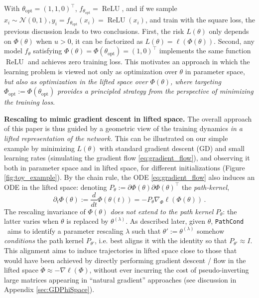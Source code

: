 \documentclass{article}
\theoremstyle{plain}
\theoremstyle{definition}
\theoremstyle{remark}
\def\Ncal{\mathcal{N}}
\def\relu{\operatorname{ReLU}}
\def\pathcond{{\texttt{PathCond} }}
\begin{document}
 With $\theta_{\operatorname{opt}} = (1, 1, 0)^\top$, $f_{\theta_{\operatorname{opt}}} = \relu$, and if 
we sample $x_i \sim \Ncal(0,1), y_i = f_{\theta_{\operatorname{opt}} }(x_{i}) = \relu(x_i)$, 
and train with the square loss, the previous discussion leads to two conclusions. First, the risk $L(\theta)$ only depends on $\Phi(\theta)$ 
when $u> 0$, it can be factorized as $L(\theta)=\ell(\Phi(\theta))$.
Second, any model $f_\theta$ satisfying 
$\Phi(\theta) = \Phi(\theta_{\operatorname{opt}}) = (1, 0)^\top$ implements the same 
function $\relu$ and achieves zero training loss. 
This motivates an approach in which the learning problem is viewed not only as optimization over $\theta$ in parameter space, 
\emph{but also as optimization in the lifted space over $\Phi(\theta)$, 
where targeting $\Phi_{\operatorname{opt}} := \Phi(\theta_{\operatorname{opt}})$ 
provides a principled strategy from the perspective of minimizing the training loss}.





\textbf{Rescaling to mimic gradient descent in lifted space.} The overall approach of this paper is thus guided by a geometric view of the training dynamics {\em in a lifted representation of the network.}
This can be illustrated on our simple example by minimizing $L(\theta)$ with standard gradient descent (GD) and small learning rates 
(simulating the gradient flow \eqref{eq:gradient_flow}), and observing 
it both in parameter space and in lifted space, for different initializations (Figure \ref{fig:toy_example}). By the chain rule, the ODE \eqref{eq:gradient_flow} also
induces an ODE in the lifted space: denoting $P_\theta := \partial \Phi(\theta)  \partial \Phi(\theta)^\top$ the {\em path-kernel},
\begin{equation}
\partial_t
 \Phi(\theta) 
:= \frac{d}{dt} \Phi(\theta(t))
= - P_\theta \nabla_\Phi \ell(\Phi(\theta))\,. 
\end{equation}
The rescaling invariance of $\Phi(\theta)$ {\em does not extend to the path kernel} $P_{\theta}$: the latter varies when $\theta$ is replaced by $\theta^{(\lambda)}$.  As described later, given $\theta$, \pathcond\ aims to identify a parameter rescaling $\lambda$ such that $\theta' := \theta^{(\lambda)}$
somehow {\em conditions} the path kernel $P_{\theta'}$, i.e. best aligns it with the identity so that $P_{\theta'} \approx I$. 
This alignment aims 
to induce trajectories in lifted space close to those that would have been achieved by directly performing gradient descent / flow in the lifted space $\dot{\Phi} \approx -\nabla \ell(\Phi)$, 
without ever incurring the cost of pseudo-inverting large matrices appearing in  ``natural gradient'' approaches (see discussion in Appendix \ref{sec:GDPhiSpace}).
\end{document}
